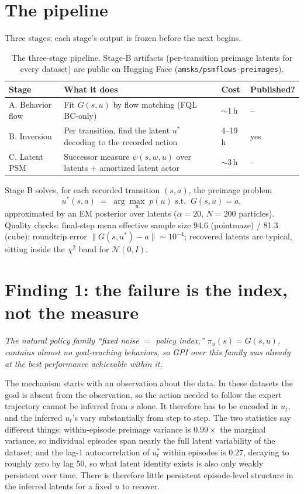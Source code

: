 \documentclass{article}
\begin{document}
\section{The pipeline}
Three stages; each stage's output is frozen before the next begins.

\begin{table}[h]
\centering
\small
\begin{tabular}{@{}llll@{}}
\toprule
Stage & What it does & Cost & Published? \\
\midrule
A. Behavior flow & Fit $G(s,u)$ by flow matching (FQL BC-only) & $\sim$1\,h & -- \\
B. Inversion & Per transition, find the latent $u^*$ decoding to the recorded action & 4--19\,h & yes \\
C. Latent PSM & Successor measure $\psi(s,w,u)$ over latents + amortized latent actor & $\sim$3\,h & -- \\
\bottomrule
\end{tabular}
\caption{The three-stage pipeline. Stage-B artifacts (per-transition preimage latents for every dataset) are public on Hugging Face (\texttt{amsks/psmflows-preimages}).}
\label{tab:pipeline}
\end{table}

Stage B solves, for each recorded transition $(s,a)$, the preimage problem
\begin{equation}
u^*(s,a) \;=\; \arg\max_{u}\; p(u)\,\,\text{s.t.}\;\; G(s,u)=a,
\label{eq:preimage}
\end{equation}
approximated by an EM posterior over latents ($\alpha=20$, $N=200$ particles). Quality checks: final-step mean effective sample size 94.6 (pointmaze) / 81.3 (cube); roundtrip error $\|G(s,u^*)-a\|\sim 10^{-4}$; recovered latents are typical, sitting inside the $\chi^2$ band for $\mathcal{N}(0,I)$.

\section{Finding 1: the failure is the index, not the measure}
\emph{The natural policy family ``fixed noise $=$ policy index,'' $\pi_u(s)=G(s,u)$, contains almost no goal-reaching behaviors, so GPI over this family was already at the best performance achievable within it.}

The mechanism starts with an observation about the data. In these datasets the goal is absent from the observation, so the action needed to follow the expert trajectory cannot be inferred from $s$ alone. It therefore has to be encoded in $u_t$, and the inferred $u_t$'s vary substantially from step to step. The two statistics say different things: within-episode preimage variance is $0.99\times$ the marginal variance, so individual episodes span nearly the full latent variability of the dataset; and the lag-1 autocorrelation of $u_t^*$ within episodes is $0.27$, decaying to roughly zero by lag 50, so what latent identity exists is also only weakly persistent over time. There is therefore little persistent episode-level structure in the inferred latents for a fixed $u$ to recover.
\end{document}
